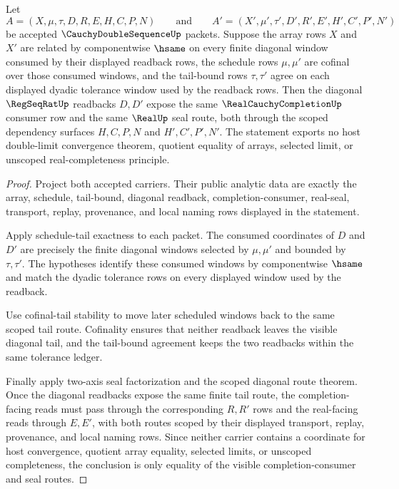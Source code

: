 \begin{theorem}
\label{thm:cauchy-double-sequence-diagonal-tail-stability}
Let
$$
A=(X,\mu,\tau,D,R,E,H,C,P,N)
\qquad\text{and}\qquad
A'=(X',\mu',\tau',D',R',E',H',C',P',N')
$$
be accepted $\CauchyDoubleSequenceUp$ packets. Suppose the array rows $X$ and $X'$ are related by componentwise $\hsame$ on every finite diagonal window consumed by their displayed readback rows, the schedule rows $\mu,\mu'$ are cofinal over those consumed windows, and the tail-bound rows $\tau,\tau'$ agree on each displayed dyadic tolerance window used by the readback rows. Then the diagonal $\RegSeqRatUp$ readbacks $D,D'$ expose the same $\RealCauchyCompletionUp$ consumer row and the same $\RealUp$ seal route, both through the scoped dependency surfaces $H,C,P,N$ and $H',C',P',N'$. The statement exports no host double-limit convergence theorem, quotient equality of arrays, selected limit, or unscoped real-completeness principle.
\end{theorem}
\begin{proof}
Project both accepted carriers. Their public analytic data are exactly the array, schedule, tail-bound, diagonal readback, completion-consumer, real-seal, transport, replay, provenance, and local naming rows displayed in the statement.

Apply schedule-tail exactness to each packet. The consumed coordinates of $D$ and $D'$ are precisely the finite diagonal windows selected by $\mu,\mu'$ and bounded by $\tau,\tau'$. The hypotheses identify these consumed windows by componentwise $\hsame$ and match the dyadic tolerance rows on every displayed window used by the readback.

Use cofinal-tail stability to move later scheduled windows back to the same scoped tail route. Cofinality ensures that neither readback leaves the visible diagonal tail, and the tail-bound agreement keeps the two readbacks within the same tolerance ledger.

Finally apply two-axis seal factorization and the scoped diagonal route theorem. Once the diagonal readbacks expose the same finite tail route, the completion-facing reads must pass through the corresponding $R,R'$ rows and the real-facing reads through $E,E'$, with both routes scoped by their displayed transport, replay, provenance, and local naming rows. Since neither carrier contains a coordinate for host convergence, quotient array equality, selected limits, or unscoped completeness, the conclusion is only equality of the visible completion-consumer and seal routes.
\end{proof}

